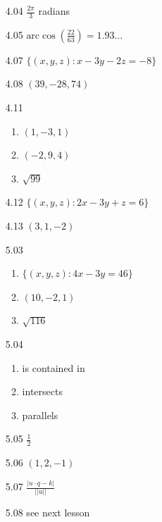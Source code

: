\documentclass{article}
\begin{document}
\begin{enumerate}
  \item[4.04] $\frac{2\pi}{3}$ radians
  \item[4.05] $\text{arc}\cos (\frac{22}{63}) = 1.93 \ldots$
  \item[4.07] $\{(x,y,z) :  x-3y-2z = -8\}$
  \item[4.08] $(39, -28, 74)$
  \item[4.11]
    \begin{enumerate}[\hspace{0.5cm}(a)]
      \item $(1, -3, 1)$
      \item $(-2, 9, 4)$
      \item $\sqrt{99}$
    \end{enumerate}
  \item[4.12] $\{ (x,y,z): 2x-3y+z = 6 \}$
  \item[4.13] $(3, 1, -2)$
\end{enumerate}
\vspace{0.5cm}

\begin{enumerate}
  \item[5.03]
    \begin{enumerate}[\hspace{0.5cm}(a)]
      \item $\{ (x,y,z): 4x-3y = 46 \}$
      \item $(10, -2, 1)$
      \item $\sqrt{116}$
    \end{enumerate}
  \item[5.04]
    \begin{enumerate}[\hspace{0.5cm}(a)]
      \item is contained in
      \item intersects
      \item parallels
    \end{enumerate}
  \item[5.05] $\frac{1}{2}$
  \item[5.06] $(1, 2, -1)$
  \item[5.07] $\frac{\vert u \cdot q-k \vert}{\vert \vert u \vert \vert}$
  \item[5.08] see next lesson
\end{enumerate}
\vspace{0.5cm}
\end{document}
